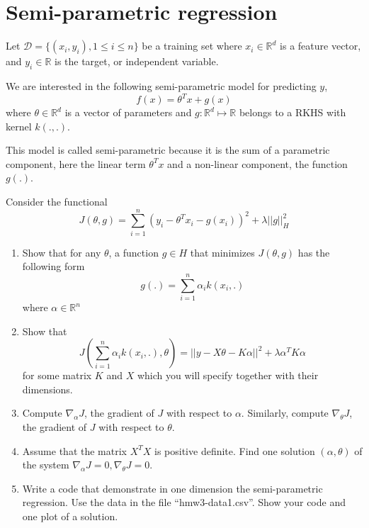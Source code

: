 \documentclass{article}[12pt]
\begin{document}
\section{Semi-parametric regression}
Let $\mathcal{D}=\{(x_i,y_i), 1 \leq i \leq n\}$ be a training set where $x_i \in \mathbb{R}^d$ is a feature vector, and $y_i \in \mathbb{R}$ is the target, or independent variable. 

We are interested in the following semi-parametric model for predicting $y$, 
\begin{equation}
f(x) = \theta^T x + g(x)
\end{equation}
where $\theta \in \mathbb{R}^d$ is a vector of parameters and $g: \mathbb{R}^d \mapsto \mathbb{R}$ belongs to a RKHS with kernel $k(.,.)$. 

This model is called semi-parametric because it is the sum of a parametric component, here the linear term $\theta^T x$ and a non-linear component, the function $g(.)$. 

Consider the functional 
\begin{equation}
J(\theta,g) = \sum_{i=1}^n \left(y_i - \theta^T x_i - g(x_i)\right)^2 + \lambda ||g||_H^2
\end{equation}
\begin{enumerate}
\item 
Show that for any $\theta$, a function $g \in H$ that minimizes $J(\theta,g)$ has the following form 
\begin{equation}
g(.)=\sum_{i=1}^n \alpha_i k(x_i,.)
\end{equation}
where $\alpha \in \mathbb{R}^n$ 
\item 
Show that 
\begin{equation}
J(\sum_{i=1}^n \alpha_i k(x_i,.),\theta)=||y - X\theta - K\alpha||^2 + \lambda \alpha^T K \alpha
\end{equation}
for some matrix $K$ and $X$ which you will specify together with their dimensions. 
\item Compute $\nabla_\alpha J$, the gradient of $J$ with respect to $\alpha$. Similarly, compute $\nabla_\theta J$, the gradient of $J$ with respect to $\theta$. 
\item Assume that the matrix $X^TX$ is positive definite.
Find one solution $(\alpha,\theta)$ of the system  $\nabla_\alpha J=0, \nabla_\theta J=0$.  
\item 
Write a code that demonstrate in one dimension the semi-parametric regression. Use the data in the file ``hmw3-data1.csv''. Show your code and one plot of a solution.  
\end{enumerate}
\end{document}
